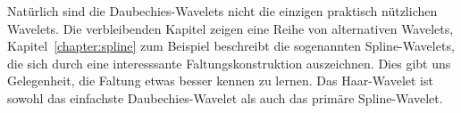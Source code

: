 Natürlich sind die Daubechies-Wavelets nicht die einzigen praktisch
%
nützlichen Wavelets.
Die verbleibenden Kapitel zeigen eine Reihe von alternativen Wavelets,
Kapitel~\ref{chapter:spline} zum Beispiel beschreibt die sogenannten
Spline-Wavelets, die sich durch eine interesssante Faltungskonstruktion
%
auszeichnen.
Dies gibt uns Gelegenheit, die Faltung etwas besser kennen zu lernen.
Das Haar-Wavelet ist sowohl das einfachste Daubechies-Wavelet als auch
das primäre Spline-Wavelet.









